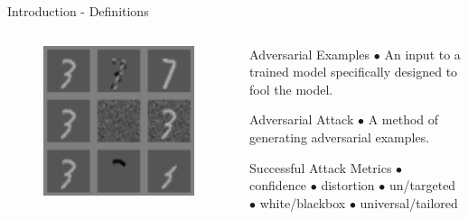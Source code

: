 \documentclass{beamer}
\begin{document}
\begin{frame}{Introduction - Definitions}
\begin{columns}
\begin{column}{.29\textwidth}
\begin{figure}
        \includegraphics[width=.93\textwidth]{images/Definitions-examples/uninteresting attacks.png}
    \end{figure}
    \vspace{-6mm}
    \end{column}
    
    \begin{column}{.55\textwidth}
        \vspace{-10mm}
        \begin{block}{Adversarial Examples}
            $\bullet$ An input to a trained model specifically designed to fool the model.\\
        \end{block}
    
        \begin{block}{Adversarial Attack}
            $\bullet$ A method of generating adversarial examples.\\
        \end{block}
        
        \begin{block}{Successful Attack Metrics}
            $\bullet$ confidence $\bullet$ distortion $\bullet$ un/targeted\\
             $\bullet$ white/blackbox $\bullet$ universal/tailored
        \end{block}
    \end{column}
    \end{columns}
    
\end{frame}
\end{document}
